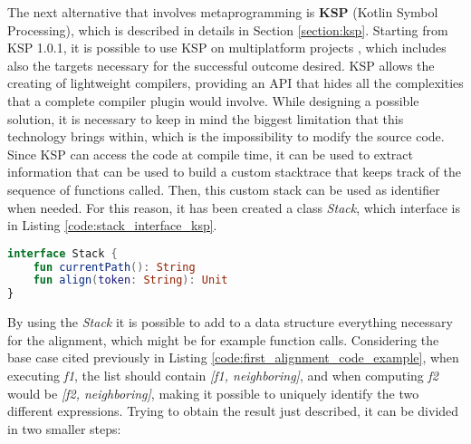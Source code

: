 The next alternative that involves metaprogramming is \textbf{KSP} (Kotlin Symbol Processing), which is described in details in Section \ref{section:ksp}. Starting from KSP 1.0.1, it is possible to use KSP on multiplatform projects \cite{ksp_multiplatform}, which includes also the targets necessary for the successful outcome desired.\newline
KSP allows the creating of lightweight compilers, providing an API that hides all the complexities that a complete compiler plugin would involve. While designing a possible solution, it is necessary to keep in mind the biggest limitation that this technology brings within, which is the impossibility to modify the source code.\newline
Since KSP can access the code at compile time, it can be used to extract information that can be used to build a custom stacktrace that keeps track of the sequence of functions called. Then, this custom stack can be used as identifier when needed. For this reason, it has been created a class \textit{Stack}, which interface is in Listing \ref{code:stack_interface_ksp}.
\begin{lstlisting}[caption={Stack interface for KSP}, captionpos=b, language=Kotlin, label={code:stack_interface_ksp}]
interface Stack {
    fun currentPath(): String
    fun align(token: String): Unit
}
\end{lstlisting}
By using the \textit{Stack} it is possible to add to a data structure everything necessary for the alignment, which might be for example function calls. Considering the base case cited previously in Listing \ref{code:first_alignment_code_example}, when executing \textit{f1}, the list should contain \textit{[f1, neighboring]}, and when computing \textit{f2} would be \textit{[f2, neighboring]}, making it possible to uniquely identify the two different expressions.\newline
Trying to obtain the result just described, it can be divided in two smaller steps:
